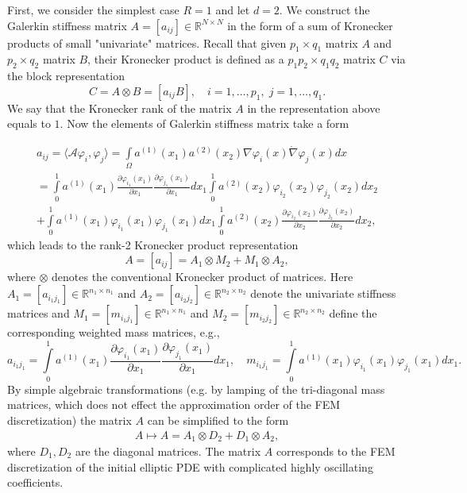 \documentclass[amstex,amstext,amsfonts,epsf,12pt] {amsart}
\newcommand{\cred}{\color{red}}
\newcommand{\cn}{\color{black}}
\newcommand\ben{\begin{eqnarray}}
\newcommand\een{\end{eqnarray}}
\def\ben{\begin{eqnarray}}
\def\een{\end{eqnarray}}
\def\IntO{\int\limits_\Omega}
\begin{document}
First, we consider the simplest case $R=1$ and let $d=2$.
We construct the Galerkin stiffness matrix $A=[a_{ij}]\in \mathbb{R}^{N\times N}$
in the form of a sum of Kronecker products of small "univariate" matrices.
Recall that given $p_1\times q_1$ matrix $A$ and 
$p_2\times q_2$ matrix $B$, their Kronecker product is defined as a $p_1 p_2 \times q_1 q_2$ 
matrix $C$ via the block representation 
$$ 
C=A \otimes B =[a_{ij}B], \quad i=1,\ldots,p_1, \; j=1,\ldots,q_1.
$$
We say that the Kronecker rank of the matrix $A$ in the representation above equals to $1$.
Now the elements of Galerkin stiffness matrix take a form 
 

\begin{multline}
a_{ij}   =  \langle {\mathcal A} \varphi_i, \varphi_j \rangle =
\IntO  a^{(1)} (x_1) a^{(2)} (x_2) 
\nabla \varphi_i (x)\dot \nabla \varphi_j (x) d x \\
    =  {\int\limits^1_0  } a^{(1)} (x_1) 
    \frac{\partial \varphi_{i_1} (x_1)}{\partial x_1 }   
   \frac{\partial \varphi_{j_1} (x_1)}{\partial x_1 } d x_1   
    \int\limits^1_0 a^{(2)} (x_2) \varphi_{i_2}(x_2)\varphi_{j_2}(x_2) d x_2    \\
    +  \int\limits^1_0  a^{(1)} (x_1) \varphi_{i_1}(x_1) \varphi_{j_1} (x_1)d x_1  
   \int\limits^1_0  a^{(2)} (x_2) \frac{\partial \varphi_{i_2} (x_2)}{\partial x_2 } 
   \frac{\partial \varphi_{j_2} (x_2)}{\partial x_2 } d x_2 , 
 \end{multline}
which leads to the rank-2 Kronecker product representation 
\[
 {A} = [a_{ij}]= {A}_1 \otimes M_2 + M_1 \otimes {A}_2,
\]
where $\otimes$ denotes the conventional Kronecker product of matrices.
Here ${A}_1=[a_{i_1j_1}]\in \mathbb{R}^{n_1\times n_1} $ and 
${A}_2=[a_{i_2 j_2}]\in \mathbb{R}^{n_2\times n_2}$ denote the univariate stiffness matrices
and $M_1=[m_{i_1j_1}]\in \mathbb{R}^{n_1\times n_1}$ and 
$M_2=[m_{i_2j_2}]\in \mathbb{R}^{n_2\times n_2}$ define the corresponding 
weighted mass matrices, e.g.,
\[
 a_{i_1j_1}= 
 {\int\limits^1_0  } a^{(1)} (x_1) 
    \frac{\partial \varphi_{i_1} (x_1)}{\partial x_1 }   
   \frac{\partial \varphi_{j_1} (x_1)}{\partial x_1 } d x_1 , \quad
  m_{i_1j_1}= 
  \int\limits^1_0  a^{(1)} (x_1) \varphi_{i_1}(x_1) \varphi_{j_1} (x_1)d x_1 .
\]
By simple algebraic transformations (e.g. by lamping of the tri-diagonal 
mass matrices, which does not effect
the approximation order of the FEM discretization)
the matrix ${A}$ can be simplified to the form   %
\ben \label{eqn:Lapl_Kron_D}
 {A} \mapsto A = A_1 \otimes D_2 + D_1 \otimes A_2,
 \een
 where $D_1, D_2$ are the diagonal matrices.  
 The matrix $A$ corresponds to the FEM discretization of the 
 initial elliptic PDE with complicated highly oscillating coefficients. 
\end{document}
